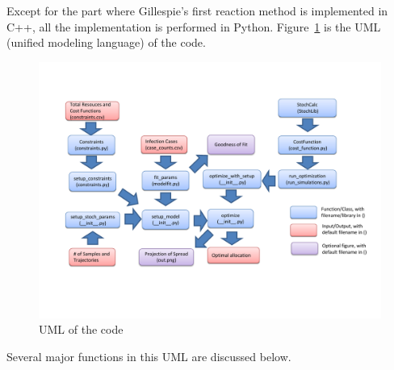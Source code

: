 \documentclass[11pt,letter]{article}
\begin{document}
Except for the part where Gillespie\rq{}s first reaction method is implemented in C++, all the implementation is performed in Python. Figure~\ref{UML} is the UML (unified modeling language) of the code.
\begin{figure}[h]
\centering
\includegraphics[width=16cm]{Design_FlowChart.pdf}
\caption{UML of the code
\label{UML}}
\end{figure}\vspace{-2mm}

Several major functions in this UML are discussed below.
\end{document}

